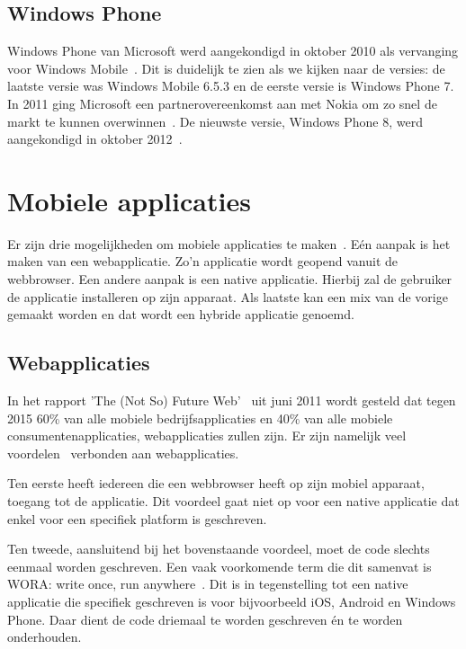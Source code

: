 \subsection{Windows Phone}
Windows Phone van Microsoft werd aangekondigd in oktober 2010 als vervanging voor Windows Mobile~\cite{Seitz2010,Lieberman2010}. Dit is duidelijk te zien als we kijken naar de versies: de laatste versie was Windows Mobile 6.5.3 en de eerste versie is Windows Phone 7. In 2011 ging Microsoft een partnerovereenkomst aan met Nokia om zo snel de markt te kunnen overwinnen~\cite{Microsoft2011}. De nieuwste versie, Windows Phone 8, werd aangekondigd in oktober 2012~\cite{Reed2012}. 


\section{Mobiele applicaties}
\label{sec:mobiele-applicaties}
Er zijn drie mogelijkheden om mobiele applicaties te maken~\cite{Accenture2012,Hales2012}. Eén aanpak is het maken van een webapplicatie. Zo'n applicatie wordt geopend vanuit de webbrowser. Een andere aanpak is een native applicatie. Hierbij zal de gebruiker de applicatie installeren op zijn apparaat. Als laatste kan een mix van de vorige gemaakt worden en dat wordt een hybride applicatie genoemd.

\subsection{Webapplicaties}
In het rapport 'The (Not So) Future Web'~\cite{Phifer2011} uit juni 2011 wordt gesteld dat tegen 2015 60\% van alle mobiele bedrijfsapplicaties en 40\% van alle mobiele consumentenapplicaties, webapplicaties zullen zijn. Er zijn namelijk veel voordelen~\cite{Accenture2012} verbonden aan webapplicaties.

Ten eerste heeft iedereen die een webbrowser heeft op zijn mobiel apparaat, toegang tot de applicatie.  Dit voordeel gaat niet op voor een native applicatie dat enkel voor een specifiek platform is geschreven. 

Ten tweede, aansluitend bij het bovenstaande voordeel, moet de code slechts eenmaal worden geschreven. Een vaak voorkomende term die dit samenvat is WORA: write once, run anywhere~\cite{Hales2012}. Dit is in tegenstelling tot een native applicatie die specifiek geschreven is voor bijvoorbeeld iOS, Android en Windows Phone. Daar dient de code driemaal te worden geschreven \'en te worden onderhouden.

